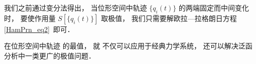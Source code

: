 

我们之前通过变分法得出， 当位形空间中轨迹 $\{q_i(t)\}$ 的两端固定而中间变化时， 要使作用量 $S[\{q_i(t)\}]$ 取极值， 我们只需要解欧拉—拉格朗日方程\autoref{HamPrn_eq2}~即可．

在位形空间中轨迹 的最值， 就 不仅可以应用于经典力学系统， 还可以解决泛函分析中一类更广的极值问题．
